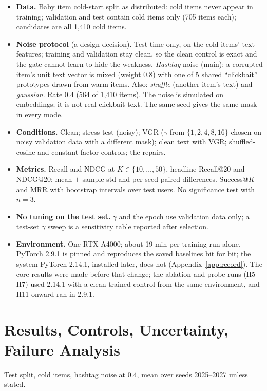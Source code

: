 \documentclass[conference]{IEEEtran}
\begin{document}
\begin{itemize}
\item \textbf{Data.} Baby item cold-start split as distributed: cold items never appear in training; validation and test contain cold items only (705 items each); candidates are all 1,410 cold items.
\item \textbf{Noise protocol} (a design decision). Test time only, on the cold items' text features; training and validation stay clean, so the clean control is exact and the gate cannot learn to hide the weakness. \emph{Hashtag} noise (main): a corrupted item's unit text vector is mixed (weight 0.8) with one of 5 shared ``clickbait'' prototypes drawn from warm items. Also: \emph{shuffle} (another item's text) and \emph{gaussian}. Rate 0.4 (564 of 1,410 items). The noise is simulated on embeddings; it is not real clickbait text. The same seed gives the same mask in every mode.
\item \textbf{Conditions.} Clean; stress test (noisy); VGR ($\gamma$ from $\{1,2,4,8,16\}$ chosen on noisy validation data with a different mask); clean text with VGR; shuffled-cosine and constant-factor controls; the repairs.
\item \textbf{Metrics.} Recall and NDCG at $K\in\{10,\dots,50\}$, headline Recall@20 and NDCG@20; mean $\pm$ sample std and per-seed paired differences. Success@$K$ and MRR with bootstrap intervals over test users. No significance test with $n=3$.
\item \textbf{No tuning on the test set.} $\gamma$ and the epoch use validation data only; a test-set $\gamma$ sweep is a sensitivity table reported after selection.
\item \textbf{Environment.} One RTX A4000; about 19 min per training run alone. PyTorch 2.9.1 is pinned and reproduces the saved baselines bit for bit; the system PyTorch 2.14.1, installed later, does not (Appendix~\ref{app:record}). The core results were made before that change; the ablation and probe runs (H5--H7) used 2.14.1 with a clean-trained control from the same environment, and H11 onward ran in 2.9.1.
\end{itemize}

\section{Results, Controls, Uncertainty, Failure Analysis}
\label{sec:results}

Test split, cold items, hashtag noise at 0.4, mean over seeds 2025--2027 unless stated.
\end{document}

